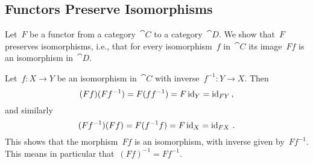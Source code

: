 \subsection{Functors Preserve Isomorphisms}

Let~$F$ be a functor from a category~$\cat{C}$ to a category~$\cat{D}$.
We show that~$F$ preserves isomorphisms, i.e., that for every isomorphism~$f$ in~$\cat{C}$ its image~$F f$ is an isomorphism in~$\cat{D}$.

Let~$f \colon X \to Y$ be an isomorphism in~$\cat{C}$ with inverse~$f^{-1} \colon Y \to X$.
Then
\[
	(F f) (F f^{-1})
	=
	F (f f^{-1})
	=
	F \operatorname{id}_Y
	=
	\operatorname{id}_{F Y} \,,
\]
and similarly
\[
	(F f^{-1}) (F f)
	=
	F (f^{-1} f)
	=
	F \operatorname{id}_X
	=
	\operatorname{id}_{F X} \,.
\]
This shows that the morphism~$F f$ is an isomorphism, with inverse given by~$F f^{-1}$.
This means in particular that~$(F f)^{-1} = F f^{-1}$.
